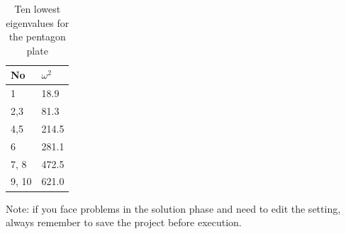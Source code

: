 \begin{table}[h]
\caption{Ten lowest eigenvalues for the pentagon plate}
\label{tb:pentagonres}
\begin{center}
\begin{tabular}{ll} \hline
No & $\omega^2$ \\ \hline
1 & 18.9 \\
2,3 & 81.3 \\
4,5 & 214.5 \\
6   & 281.1 \\
7, 8 & 472.5 \\
9, 10 & 621.0 \\ \hline
\end{tabular}
\end{center}
\end{table}

Note: if you face problems in the solution phase and need to edit the setting, always remember to save
the project before execution.

